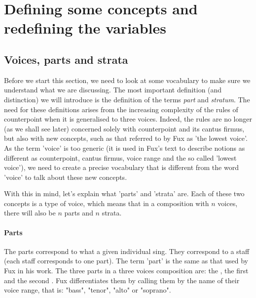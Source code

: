 \chapter{Defining some concepts and redefining the variables} 
\section{Voices, parts and strata}\label{section:parts-and-strata}
Before we start this section, we need to look at some vocabulary to make sure we understand what we are discussing. The most important definition (and distinction) we will introduce is the definition of the terms \textit{part} and \textit{stratum}. The need for these definitions arises from the increasing complexity of the rules of counterpoint when it is generalised to three voices. Indeed, the rules are no longer (as we shall see later) concerned solely with counterpoint and its cantus firmus, but also with new concepts, such as that referred to by Fux as 'the lowest voice'. As the term 'voice' is too generic (it is used in Fux's text to describe notions as different as counterpoint, cantus firmus, voice range and the so called 'lowest voice'), we need to create a precise vocabulary that is different from the word 'voice' to talk about these new concepts. 

With this in mind, let's explain what 'parts' and 'strata' are. Each of these two concepts is a type of voice, which means that in a composition with $n$ voices, there will also be $n$ parts and $n$ strata.

\subsubsection{Parts}
The parts correspond to what a given individual sing. They correspond to a staff (each staff corresponds to one part). The term 'part' is the same as that used by Fux in his work. The three parts in a three voices composition are: the \cf, the first \cp and the second \cp. Fux differentiates them by calling them by the name of their voice range, that is: "bass", "tenor", "alto" or "soprano".

